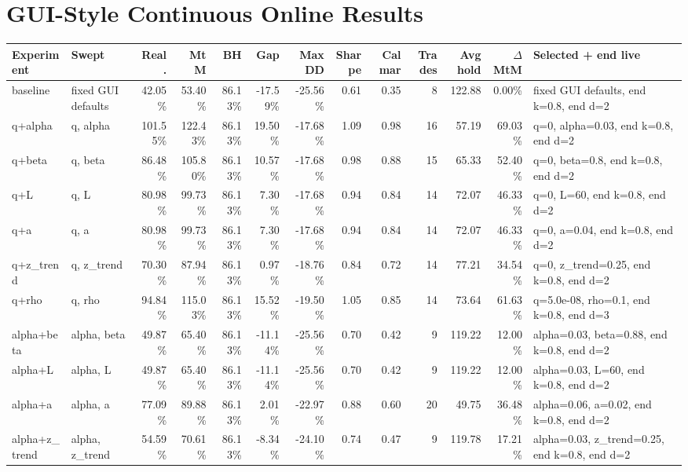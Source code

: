 \documentclass[10pt]{article}
\begin{document}
\section*{GUI-Style Continuous Online Results}
\scriptsize
\setlength{\tabcolsep}{3pt}
\begin{longtable}{p{0.9in}p{1.15in}rrrrrrrrrrp{1.1in}}
\toprule
Experiment & Swept & Real. & MtM & BH & Gap & Max DD & Sharpe & Calmar & Trades & Avg hold & $\Delta$ MtM & Selected + end live \\
\midrule
baseline & fixed GUI defaults & 42.05\% & 53.40\% & 86.13\% & -17.59\% & -25.56\% & 0.61 & 0.35 & 8 & 122.88 & 0.00\% & fixed GUI defaults, end k=0.8, end d=2 \\
q+alpha & q, alpha & 101.55\% & 122.43\% & 86.13\% & 19.50\% & -17.68\% & 1.09 & 0.98 & 16 & 57.19 & 69.03\% & q=0, alpha=0.03, end k=0.8, end d=2 \\
q+beta & q, beta & 86.48\% & 105.80\% & 86.13\% & 10.57\% & -17.68\% & 0.98 & 0.88 & 15 & 65.33 & 52.40\% & q=0, beta=0.8, end k=0.8, end d=2 \\
q+L & q, L & 80.98\% & 99.73\% & 86.13\% & 7.30\% & -17.68\% & 0.94 & 0.84 & 14 & 72.07 & 46.33\% & q=0, L=60, end k=0.8, end d=2 \\
q+a & q, a & 80.98\% & 99.73\% & 86.13\% & 7.30\% & -17.68\% & 0.94 & 0.84 & 14 & 72.07 & 46.33\% & q=0, a=0.04, end k=0.8, end d=2 \\
q+z\_trend & q, z\_trend & 70.30\% & 87.94\% & 86.13\% & 0.97\% & -18.76\% & 0.84 & 0.72 & 14 & 77.21 & 34.54\% & q=0, z\_trend=0.25, end k=0.8, end d=2 \\
q+rho & q, rho & 94.84\% & 115.03\% & 86.13\% & 15.52\% & -19.50\% & 1.05 & 0.85 & 14 & 73.64 & 61.63\% & q=5.0e-08, rho=0.1, end k=0.8, end d=3 \\
alpha+beta & alpha, beta & 49.87\% & 65.40\% & 86.13\% & -11.14\% & -25.56\% & 0.70 & 0.42 & 9 & 119.22 & 12.00\% & alpha=0.03, beta=0.88, end k=0.8, end d=2 \\
alpha+L & alpha, L & 49.87\% & 65.40\% & 86.13\% & -11.14\% & -25.56\% & 0.70 & 0.42 & 9 & 119.22 & 12.00\% & alpha=0.03, L=60, end k=0.8, end d=2 \\
alpha+a & alpha, a & 77.09\% & 89.88\% & 86.13\% & 2.01\% & -22.97\% & 0.88 & 0.60 & 20 & 49.75 & 36.48\% & alpha=0.06, a=0.02, end k=0.8, end d=2 \\
alpha+z\_trend & alpha, z\_trend & 54.59\% & 70.61\% & 86.13\% & -8.34\% & -24.10\% & 0.74 & 0.47 & 9 & 119.78 & 17.21\% & alpha=0.03, z\_trend=0.25, end k=0.8, end d=2 \\

\end{longtable}
\end{document}
